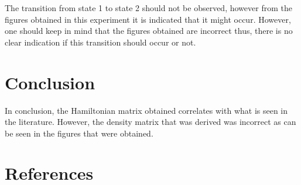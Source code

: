 \documentclass[12pt, a4paper]{article}
\begin{document}
The transition from state 1 to state 2 should not be observed, however from the figures obtained in this experiment it is indicated that it might occur. However, one should keep in mind that the figures obtained are incorrect thus, there is no clear indication if this transition should occur or not.

\section{Conclusion}
In conclusion, the Hamiltonian matrix obtained correlates with what is seen in the literature. However, the density matrix that was derived was incorrect as can be seen in the figures that were obtained.

\section{References}
\printbibliography[heading=none]
\end{document}
